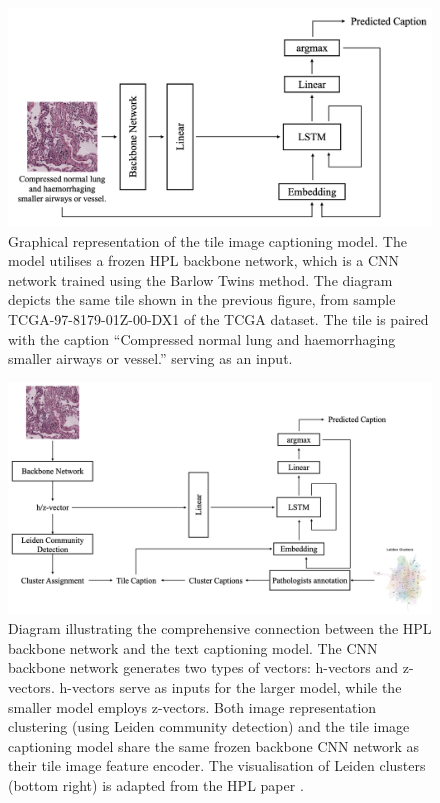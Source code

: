\documentclass{l4proj}
\begin{document}
\begin{figure}[h!]
    \centering
    \includegraphics[width=1\linewidth]{images/lstm.png}
    \caption{Graphical representation of the tile image captioning model. The model utilises a frozen HPL backbone network, which is a CNN network trained using the Barlow Twins method. The diagram depicts the same tile shown in the previous figure, from sample TCGA-97-8179-01Z-00-DX1 of the TCGA dataset. The tile is paired with the caption ``Compressed normal lung and haemorrhaging smaller airways or vessel.'' serving as an input.}
    \label{fig:lstm-cap}
\end{figure}

\begin{figure}[h!]
    \centering
    \includegraphics[width=1\linewidth]{images/full-work.png}
    \caption{Diagram illustrating the comprehensive connection between the HPL backbone network and the text captioning model. The CNN backbone network generates two types of vectors: h-vectors and z-vectors. h-vectors serve as inputs for the larger model, while the smaller model employs z-vectors. Both image representation clustering (using Leiden community detection) and the tile image captioning model share the same frozen backbone CNN network as their tile image feature encoder. The visualisation of Leiden clusters (bottom right) is adapted from the HPL paper \citep{ClaudioQuiros2024}.}
    \label{fig:workflow-full}
\end{figure}
\clearpage
\end{document}
